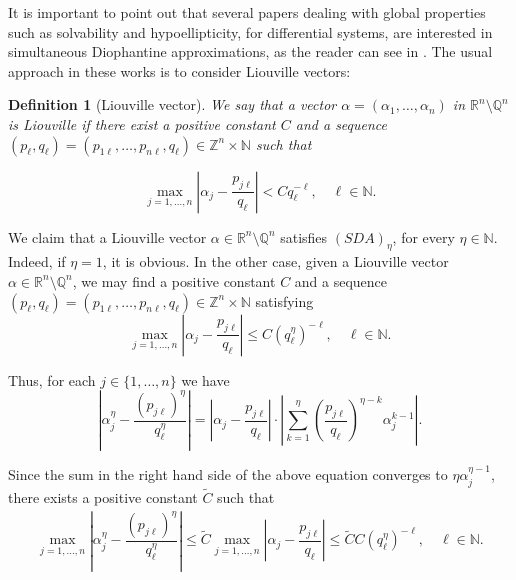 \documentclass[12pt]{elsarticle}
\newtheorem{definition}[theorem]{Definition}
\numberwithin{equation}{section}
\begin{document}
It is important to point out that  several papers dealing with global properties such as solvability and hypoellipticity, for differential systems, are inte\-res\-ted in simultaneous Diophantine approximations, as the reader can see in  \cite{BERG99,BCM93,BdMZ12,BP,himonas99,Him01,moser}. The usual approach in these works is to consider Liouville vectors:
\begin{definition}[Liouville vector]
	We say that a vector  $\alpha=(\alpha_1,\ldots,\alpha_n)$ in $\mathbb{R}^n\setminus \mathbb{Q}^n$ is  Liouville if  there exist a positive  constant $C$ and a sequence $(p_\ell,q_\ell)=(p_{1\ell},\ldots,p_{n\ell},q_\ell)\in\mathbb{Z}^n\times \mathbb{N}$ such that
	
	\begin{equation}\label{Liouville vector}
	\max_{j=1,\dots,n}\left|\alpha_{j}-\dfrac{p_{j\ell}}{q_\ell}\right|<  C q_{\ell}^{-\ell}, \quad \ell \in\mathbb{N}.
	\end{equation}	
\end{definition}	


We claim that a Liouville vector $\alpha\in\mathbb{R}^n\setminus \mathbb{Q}^n $ satisfies  $(SDA)_{\eta}$, for every $\eta\in\mathbb{N}$. Indeed, if $\eta=1$, it is obvious. In the other case, given a Liouville vector $\alpha\in\mathbb{R}^n\setminus \mathbb{Q}^n$, we may find  a positive  constant $C$ and a sequence $(p_\ell,q_\ell)=(p_{1\ell},\ldots,p_{n\ell},q_\ell)\in\mathbb{Z}^n\times \mathbb{N}$ satisfying
$$
\max_{j=1,\dots,n} \left|\alpha_j-\dfrac{p_{j\ell}}{q_\ell}\right|
\leq  C (q_\ell^{\eta} )^{-\ell}, \quad \ell \in\mathbb{N}.
$$

Thus, for each $j\in\{1,\ldots,n\}$ we have 
\begin{equation*}
\left|\alpha_j^{\eta}-\dfrac{(p_{j\ell})^{\eta}}{q_\ell^{\eta}}\right|= \left|\alpha_j-\dfrac{p_{j\ell}}{q_\ell}\right|\cdot \left|\sum_{k=1}^{\eta}\left(\dfrac{p_{j\ell}}{q_{\ell}}\right)^{\eta-k}\alpha_j^{k-1}\right|.
\end{equation*}

Since the sum in the right hand side of the above equation converges to $\eta\alpha_j^{\eta-1}$, there exists a positive constant $\widetilde{C}$ such that 
\begin{eqnarray*}
	\max_{j=1,\dots,n} \left|\alpha_j^{\eta}-\dfrac{(p_{j\ell})^{\eta}}{q_\ell^{\eta}}\right| \leq \widetilde{C} \max_{j=1,\dots,n} \left|\alpha_j-\dfrac{p_{j\ell}}{q_\ell}\right|
	\leq \widetilde{C} C (q_\ell^{\eta} )^{-\ell}, \quad \ell \in\mathbb{N}.
\end{eqnarray*}
\end{document}
